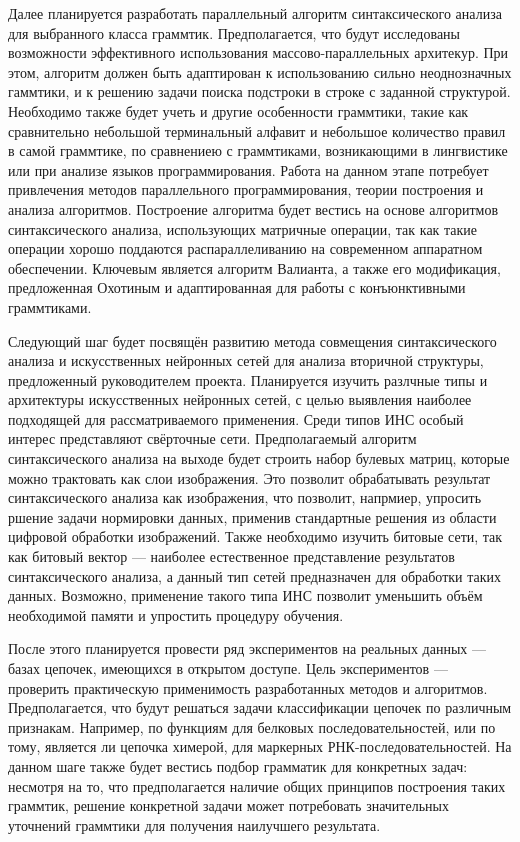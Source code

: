 ﻿\documentclass[12pt]{article}  %
\theoremstyle{remark}
\begin{document}
Далее планируется разработать параллельный алгоритм синтаксического анализа для выбранного класса граммтик.
Предполагается, что будут исследованы возможности эффективного использования массово-параллельных архитекур.
При этом, алгоритм должен быть адаптирован к использованию сильно неоднозначных гаммтики, и к решению задачи поиска подстроки в строке с заданной структурой.
Необходимо также будет учеть и другие особенности граммтики, такие как сравнительно небольшой терминальный алфавит и небольшое количество правил в самой граммтике, по сравнениею с граммтиками, возникающими в лингвистике или при анализе языков программирования.
Работа на данном этапе потребует привлечения методов параллельного программирования, теории построения и анализа алгоритмов.
Построение алгоритма будет вестись на основе алгоритмов синтаксического анализа, использующих матричные операции, так как такие операции хорошо поддаются распараллеливанию на современном аппаратном обеспечении.
Ключевым является алгоритм Валианта, а также его модификация, предложенная Охотиным и адаптированная для работы с конъюнктивными граммтиками.

Следующий шаг будет посвящён развитию метода совмещения синтаксического анализа и искусственных нейронных сетей для анализа вторичной структуры, предложенный руководителем проекта.
Планируется изучить разлчные типы и архитектуры искусственных нейронных сетей, с целью выявления наиболее подходящей для рассматриваемого применения.
Среди типов ИНС особый интерес представляют свёрточные сети.
Предполагаемый алгоритм синтаксического анализа на выходе будет строить набор булевых матриц, которые можно трактовать как слои изображения.
Это позволит обрабатывать результат синтаксического анализа как изображения, что позволит, напрмиер, упросить ршение задачи нормировки данных, применив стандартные решения из области цифровой обработки изображений.
Также необходимо изучить битовые сети, так как битовый вектор --- наиболее естественное представление результатов синтаксического анализа, а данный тип сетей предназначен для обработки таких данных.
Возможно, применение такого типа ИНС позволит уменьшить объём необходимой памяти и упростить процедуру обучения.

После этого планируется провести ряд экспериментов на реальных данных --- базах цепочек, имеющихся в открытом доступе.
Цель экспериментов --- проверить практическую применимость разработанных методов и алгоритмов.
Предполагается, что будут решаться задачи классификации цепочек по различным признакам.
Например, по функциям для белковых последовательностей, или по тому, является ли цепочка химерой, для маркерных РНК-последовательностей.
На данном шаге также будет вестись подбор грамматик для конкретных задач: несмотря на то, что предполагается наличие общих принципов построения таких граммтик, решение конкретной задачи может потребовать значительных уточнений граммтики для получения наилучшего результата.
\end{document}
